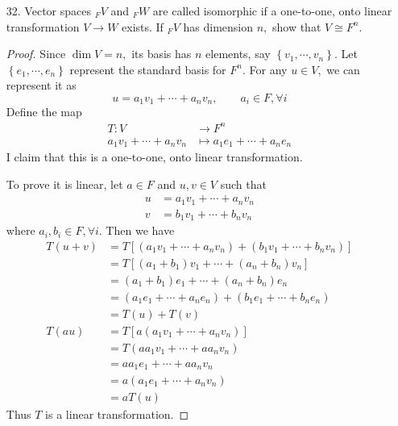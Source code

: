 \documentclass{article}
\DeclareMathOperator{\ima}{im}
\begin{document}
\begin{itemize}
\begin{enumerate}[(a)]
			\item If $V$ is finite dimensional, show that $\dim V=\dim(\ker \varphi)+\dim(\ima \varphi).$ 
				\begin{proof}
					If $\dim V=\dim(\ker \varphi),$ then $\ker \varphi=V,$ so then $\dim(\ima \varphi)=\dim \left\{ 0 \right\} = 0,$ and the relation is satisfied.

					Otherwise, since $\ker\varphi\subsetneq V,$ we have $\dim(\ker \varphi)<n.$ Let $\dim (\ker \varphi)=m,$ so that $\left\{ u_1, \cdots, u_m \right\}$ is a basis for $\ker \varphi.$ Then there exists some $v_1\in V$ such that $v_1\notin \ker\varphi.$
				\end{proof}<++>
		\end{enumerate}

	\item[32.] Vector spaces $_F V$ and $_F W$ are called isomorphic if a one-to-one, onto linear transformation $V\to W$ exists. If $_F V$ has dimension $n,$ show that $V\cong F^n.$
		\begin{proof}
			Since $\dim V=n,$ its basis has $n$ elements, say $\left\{ v_1, \cdots, v_n \right\}.$ Let $\left\{ e_1, \cdots, e_n \right\}$ represent the standard basis for $F^n.$ For any $u\in V,$ we can represent it as
			\[u = a_1v_1+\cdots+a_nv_n, \quad\quad a_i\in F, \forall i\]
			Define the map
			\begin{align*}
				T:V&\to F^n \\
				a_1v_1+\cdots+a_nv_n &\mapsto a_1e_1+\cdots+a_ne_n
			\end{align*}
			I claim that this is a one-to-one, onto linear transformation. 

			To prove it is linear, let $a\in F$ and $u, v\in V$ such that 
			\begin{align*}
				u &= a_1v_1 + \cdots + a_nv_n \\
				v &= b_1v_1 + \cdots + b_nv_n
			\end{align*}
			where $a_i, b_i\in F, \forall i.$ Then we have
			\begin{align*}
				T(u+v) &= T\left[ (a_1v_1+\cdots+a_nv_n) + (b_1v_1+\cdots+b_nv_n) \right] \\
				&= T\left[ (a_1+b_1)v_1 + \cdots + (a_n+b_n)v_n \right] \\
				&= (a_1+b_1)e_1 + \cdots + (a_n+b_n)e_n \\
				&= \left( a_1e_1 + \cdots + a_ne_n \right) + \left( b_1e_1+\cdots+b_ne_n \right) \\
				&= T(u) + T(v) \\
				T(au) &= T\left[ a(a_1v_1+\cdots+a_nv_n) \right] \\
				&= T(aa_1v_1 + \cdots + aa_nv_n) \\
				&= aa_1e_1 + \cdots + aa_nv_n \\
				&= a(a_1e_1 + \cdots + a_nv_n) \\
				&= aT(u)
			\end{align*}
			Thus $T$ is a linear transformation.


\end{proof}
\end{itemize}
\end{document}
